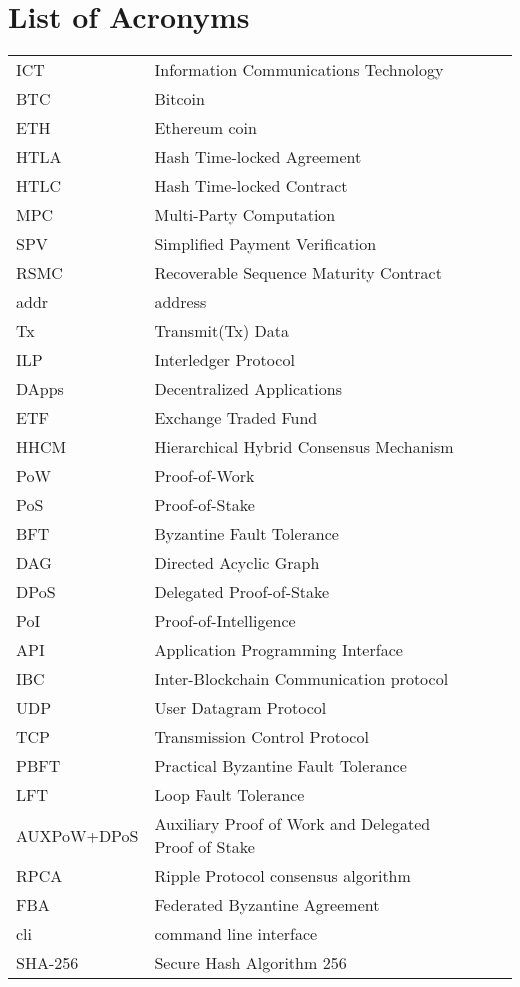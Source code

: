 \chapter{List of Acronyms}

\begin{table}[h]
\begin{tabular}{p{2.7cm}lp{8cm}l}

ICT              & Information Communications Technology \\
BTC              & Bitcoin \\ 	
ETH              & Ethereum coin\\
HTLA             & Hash Time-locked Agreement \\
HTLC             & Hash Time-locked Contract \\ 	
MPC              & Multi-Party Computation \\
SPV              & Simplified Payment Verification \\ 	
RSMC             & Recoverable Sequence Maturity Contract \\
addr             & address\\
Tx               & Transmit(Tx) Data \\
ILP              & Interledger Protocol \\ 	
DApps            & Decentralized Applications \\
ETF				 & Exchange Traded Fund\\	
HHCM             & Hierarchical Hybrid Consensus Mechanism\\
PoW              & Proof-of-Work\\
PoS              & Proof-of-Stake\\
BFT              & Byzantine Fault Tolerance\\
DAG              & Directed Acyclic Graph\\
DPoS             & Delegated Proof-of-Stake\\
PoI              & Proof-of-Intelligence\\
API              & Application Programming Interface\\
IBC              & Inter-Blockchain Communication protocol\\
UDP              & User Datagram Protocol\\
TCP              & Transmission Control Protocol\\
PBFT             & Practical Byzantine Fault Tolerance\\
LFT              & Loop Fault Tolerance\\
AUXPoW+DPoS	 	 & Auxiliary Proof of Work and Delegated Proof of Stake\\
RPCA			 & Ripple Protocol consensus algorithm \\
FBA				 & Federated Byzantine Agreement\\
cli				 & command line interface\\
SHA-256 		 & Secure Hash Algorithm 256\\
\end{tabular}
\end{table}